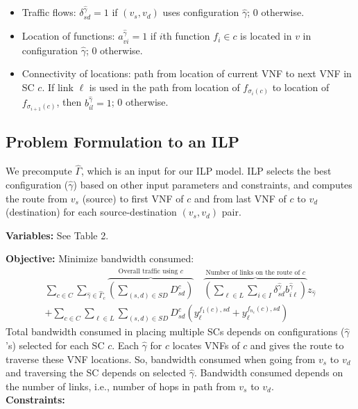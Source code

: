 \documentclass[12pt]{article}
\begin{document}
\begin{itemize}
  \item Traffic flows: $\delta^{\hat{\gamma}}_{sd}= 1$ if $(v_s, v_d)$ uses configuration $ \hat{\gamma}$; 0 otherwise.
  \item Location of functions: $a^{\hat{\gamma}}_{vi} = 1$ if $i$th function $f_i \in c$ is located in $v$ in configuration $\hat{\gamma}$; 0 otherwise.
  \item Connectivity of locations: path from location of current VNF to next VNF in SC $c$. If link $\ell$ is used in the path from location of $f_{\sigma_i (c)}$ to location of $f_{\sigma_{i+1}(c)}$, then $b_{il}^{\hat{\gamma}} = 1$; 0 otherwise.\\
 
\end{itemize}
\subsection{Problem Formulation to an ILP}
We precompute $\hat{\Gamma}$, which is an input for our ILP model. ILP selects the best configuration ($\hat{\gamma}$) based on other input parameters and constraints, and computes the route from $v_s$ (source) to first VNF of $c$ and from last VNF of $c$ to $v_d$ (destination) for each source-destination $(v_s, v_d)$ pair.

\textbf{Variables:} See Table 2.

\textbf{Objective:} Minimize bandwidth consumed:
\begin{equation}
\begin{split}
\sum_{c \in C}\sum_{\hat{\gamma}\in \hat{\Gamma}_c}
\overbrace{(\sum_{(s, d)\in SD} D^{c}_{sd})}^{\textrm{Overall traffic  using $c$}} \quad
\overbrace{(\sum_{\ell \in L} \sum_{i \in I} \delta_{sd}^{\hat{\gamma}} b_{i\ell}^{\hat{\gamma}})}^{\textrm{Number of links on the route of $c$}}
z_{{\hat{\gamma}}} \\ +\sum_{c \in C} 
\sum_{\ell \in L}\sum_{(s, d)\in SD}D_{sd}^{c}(y_{\ell}^{f_{1} (c),sd}+y_{\ell}^{f_{n_c} (c),sd})
\end{split}
\end{equation}
Total bandwidth consumed in placing multiple SCs depends on configurations ($\hat{\gamma}$’s) selected for each SC $c$. Each $\hat{\gamma}$ for $c$ locates VNFs of $c$ and gives the route to traverse these VNF locations. So, bandwidth consumed when going from $v_s$ to $v_d$ and traversing the SC depends on selected $\hat{\gamma}$. Bandwidth consumed depends on the number of links, i.e., number of hops in path from $v_s$ to $v_d$.\\
\textbf{Constraints:}
\end{document}
